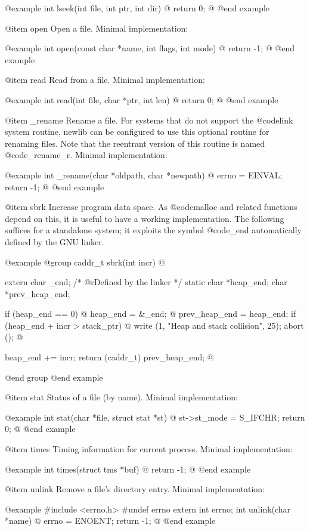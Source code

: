 @example
int lseek(int file, int ptr, int dir) @{
  return 0;
@}
@end example

@item open
Open a file.  Minimal implementation:

@example
int open(const char *name, int flags, int mode) @{
  return -1;
@}
@end example

@item read
Read from a file.  Minimal implementation:

@example
int read(int file, char *ptr, int len) @{
  return 0;
@}
@end example

@item _rename
Rename a file.  For systems that do not support the @code{link} system
routine, newlib can be configured to use this optional routine for
renaming files.  Note that the reentrant version of this routine is
named @code{_rename_r}.  Minimal implementation:

@example
int _rename(char *oldpath, char *newpath) @{
  errno = EINVAL;
  return -1;
@}
@end example

@item sbrk
Increase program data space.  As @code{malloc} and related functions
depend on this, it is useful to have a working implementation.  The
following suffices for a standalone system; it exploits the symbol
@code{_end} automatically defined by the GNU linker.

@example
@group
caddr_t sbrk(int incr) @{
  extern char _end;		/* @r{Defined by the linker} */
  static char *heap_end;
  char *prev_heap_end;
 
  if (heap_end == 0) @{
    heap_end = &_end;
  @}
  prev_heap_end = heap_end;
  if (heap_end + incr > stack_ptr) @{
    write (1, "Heap and stack collision\n", 25);
    abort ();
  @}

  heap_end += incr;
  return (caddr_t) prev_heap_end;
@}
@end group
@end example

@item stat
Status of a file (by name).  Minimal implementation:

@example
int stat(char *file, struct stat *st) @{
  st->st_mode = S_IFCHR;
  return 0;
@}
@end example

@item times
Timing information for current process.  Minimal implementation:

@example
int times(struct tms *buf) @{
  return -1;
@}
@end example

@item unlink
Remove a file's directory entry.  Minimal implementation:

@example
#include <errno.h>
#undef errno
extern int errno;
int unlink(char *name) @{
  errno = ENOENT;
  return -1; 
@}
@end example

